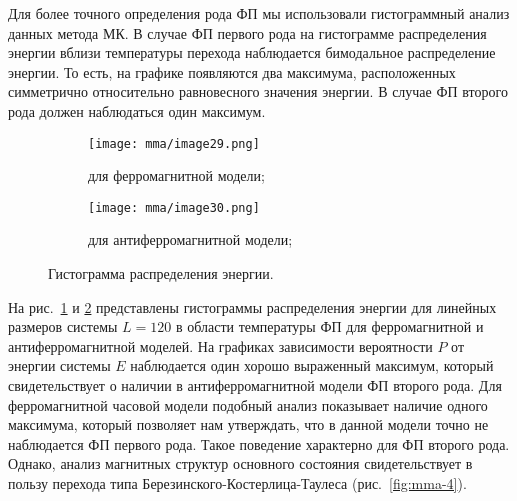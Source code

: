Для более точного определения рода ФП мы использовали гистограммный анализ данных метода МК. В случае ФП первого рода на гистограмме распределения энергии вблизи температуры перехода наблюдается бимодальное распределение энергии. То есть, на графике появляются два максимума, расположенных симметрично относительно равновесного значения энергии. В случае ФП второго рода должен наблюдаться один максимум.

\begin{figure}[ht]
    \centering
    \begin{subfigure}{0.45\textwidth}
        \texttt{[image: mma/image29.png]}
        \caption{для ферромагнитной модели;}
        \label{fig:mma-7a}
    \end{subfigure}
    \begin{subfigure}{0.45\textwidth}
        \texttt{[image: mma/image30.png]}
        \caption{для антиферромагнитной модели;}
        \label{fig:mma-7b}
    \end{subfigure}
    \caption{Гистограмма распределения энергии.}
    \label{fig:mma-7}
\end{figure}

На рис.~\ref{fig:mma-7a} и \ref{fig:mma-7b} представлены гистограммы распределения энергии для линейных размеров системы $L =120$ в области температуры ФП для ферромагнитной и антиферромагнитной моделей. На графиках зависимости вероятности $P$ от энергии системы $E$ наблюдается один хорошо выраженный максимум, который свидетельствует о наличии в антиферромагнитной модели ФП второго рода. Для ферромагнитной часовой модели подобный анализ показывает наличие одного максимума, который позволяет нам утверждать, что в данной модели точно не наблюдается ФП первого рода. Такое поведение характерно для ФП второго рода. Однако, анализ магнитных структур основного состояния свидетельствует в пользу перехода типа Березинского-Костерлица-Таулеса (рис.~\ref{fig:mma-4}). 



